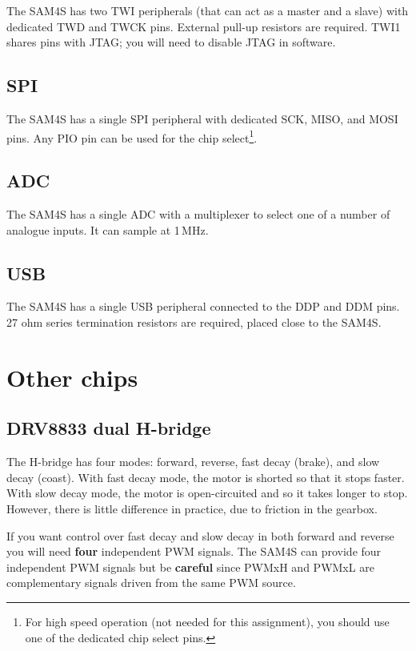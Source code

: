 The SAM4S has two TWI peripherals (that can act as a master and
a slave) with dedicated TWD and TWCK pins. External pull-up resistors
are required.  TWI1 shares pins with JTAG; you will need to disable
JTAG in software.

\subsection{SPI}\label{spi}

The SAM4S has a single SPI peripheral with dedicated SCK, MISO, and
MOSI pins. Any PIO pin can be used for the chip select\footnote{For
  high speed operation (not needed for this assignment), you should
  use one of the dedicated chip select pins.}.

\subsection{ADC}\label{adc}

The SAM4S has a single ADC with a multiplexer to select one of a
number of analogue inputs.  It can sample at 1\,MHz.

\subsection{USB}\label{usb}

The SAM4S has a single USB peripheral connected to the DDP and DDM
pins. 27 ohm series termination resistors are required, placed close to
the SAM4S.

\section{Other chips}\label{other-chips}

\subsection{DRV8833 dual H-bridge}\label{drv8833-dual-h-bridge}

The H-bridge has four modes: forward, reverse, fast decay (brake), and
slow decay (coast).  With fast decay mode, the motor is shorted so
that it stops faster.  With slow decay mode, the motor is
open-circuited and so it takes longer to stop.  However, there is
little difference in practice, due to friction in the gearbox.

If you want control over fast decay and slow decay in both forward and
reverse you will need \textbf{four} independent PWM signals. The SAM4S
can provide four independent PWM signals but be \textbf{careful} since
PWMxH and PWMxL are complementary signals driven from the same PWM
source.

